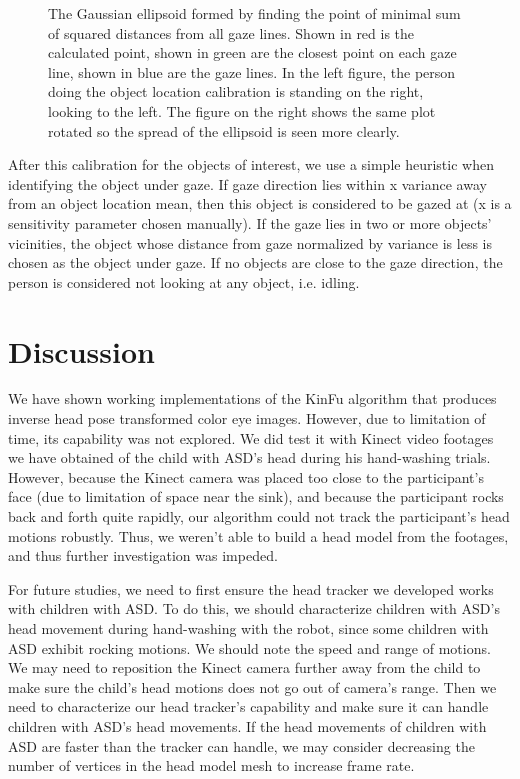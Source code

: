 \documentclass{ut-thesis}
\begin{document}
\begin{figure}[h]
\begin{subfigure}[b]{0.49\textwidth}
	\end{subfigure}
	\caption{The Gaussian ellipsoid formed by finding the point of minimal sum of squared distances from all gaze lines.  Shown in red is the calculated point, shown in green are the closest point on each gaze line, shown in blue are the gaze lines.  In the left figure, the person doing the object location calibration is standing on the right, looking to the left.  The figure on the right shows the same plot rotated so the spread of the ellipsoid is seen more clearly.}
	\label{fig:locCalibResults}
\end{figure}

After this calibration for the objects of interest, we use a simple heuristic when identifying the object under gaze.  If gaze direction lies within x variance away from an object location mean, then this object is considered to be gazed at (x is a sensitivity parameter chosen manually).  If the gaze lies in two or more objects' vicinities, the object whose distance from gaze normalized by variance is less is chosen as the object under gaze.  If no objects are close to the gaze direction, the person is considered not looking at any object, i.e. idling.

\section{Discussion}
We have shown working implementations of the KinFu algorithm that produces inverse head pose transformed color eye images.  However, due to limitation of time, its capability was not explored.  We did test it with Kinect video footages we have obtained of the child with ASD's head during his hand-washing trials.  However, because the Kinect camera was placed too close to the participant's face (due to limitation of space near the sink), and because the participant rocks back and forth quite rapidly, our algorithm could not track the participant's head motions robustly.  Thus, we weren't able to build a head model from the footages, and thus further investigation was impeded.

For future studies, we need to first ensure the head tracker we developed works with children with ASD.  To do this, we should characterize children with ASD's head movement during hand-washing with the robot, since some children with ASD exhibit rocking motions.  We should note the speed and range of motions.  We may need to reposition the Kinect camera further away from the child to make sure the child's head motions does not go out of camera's range.  Then we need to characterize our head tracker's capability and make sure it can handle children with ASD's head movements.  If the head movements of children with ASD are faster than the tracker can handle, we may consider decreasing the number of vertices in the head model mesh to increase frame rate.
\end{document}
